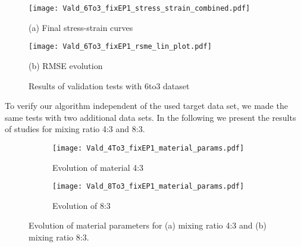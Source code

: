 \begin{figure}[H]
    \centering
    \begin{minipage}[t]{0.495\textwidth}
        \centering
        \texttt{[image: Vald\_6To3\_fixEP1\_stress\_strain\_combined.pdf]}
        \caption*{(a) Final stress-strain curves}
        \label{fig:validationStressStrain6to3}
    \end{minipage}
    \hfill
    \begin{minipage}[t]{0.495\textwidth}
        \centering
        \texttt{[image: Vald\_6To3\_fixEP1\_rsme\_lin\_plot.pdf]}
        \caption*{(b) RMSE evolution}
        \label{subfigure:validation-rmse-6to3}
    \end{minipage}
    \caption{Results of validation tests with 6to3 dataset}
    \label{fig:validation results 6to3}
\end{figure}



To verify our algorithm independent of the used target data set, we made the same tests with two additional data sets. In the following we present the results of studies for mixing ratio 4:3 and 8:3. 


\begin{figure}[H]
\centering

\begin{subfigure}[t]{1.0\textwidth}
    \centering
    \texttt{[image: Vald\_4To3\_fixEP1\_material\_params.pdf]}
    \caption{Evolution of material 4:3}
    \label{fig:material_params_4to3}
\end{subfigure}
\begin{subfigure}[t]{1.0\textwidth}
    \centering
    \texttt{[image: Vald\_8To3\_fixEP1\_material\_params.pdf]}
    \caption{Evolution of 8:3}
    \label{fig:material_params_8to3}
\end{subfigure}

\caption{Evolution of material parameters for (a) mixing ratio 4:3 and (b) mixing ratio 8:3.}
\label{fig:validation_material_params}
\end{figure}


